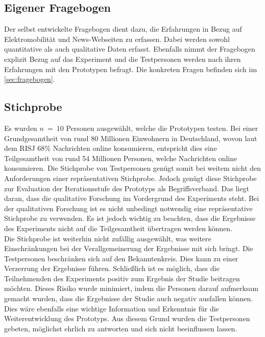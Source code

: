 \subsection{Eigener Fragebogen}
Der selbst entwickelte Fragebogen dient dazu, die Erfahrungen in Bezug auf Elektromobilität und News-Webseiten zu erfassen.
Dabei werden sowohl quantitative als auch qualitative Daten erfasst.
Ebenfalls nimmt der Fragebogen explizit Bezug auf das Experiment und die Testpersonen werden nach ihren Erfahrungen mit den Prototypen befragt.
Die konkreten Fragen befinden sich im \autoref{sec:fragebogen}.

\subsection{Stichprobe}
Es wurden $n\ =\ 10$ Personen ausgewählt, welche die Prototypen testen.
Bei einer Grundgesamtheit von rund 80 Millionen Einwohnern in Deutschland, wovon laut dem \ac{RISJ} $68\%$ Nachrichten online konsumieren, entspricht dies eine Teilgesamtheit von rund 54 Millionen Personen, welche Nachrichten online konsumieren.
Die Stichprobe von Testpersonen genügt somit bei weitem nicht den Anforderungen einer repräsentativen Stichprobe.
Jedoch genügt diese Stichprobe zur Evaluation der Iterationsstufe des Prototyps als Begriffsverband.
Das liegt daran, dass die qualitative Forschung im Vordergrund des Experiments steht.
Bei der qualitativen Forschung ist es nicht unbedingt notwendig eine repräsentative Stichprobe zu verwenden.
Es ist jedoch wichtig zu beachten, dass die Ergebnisse des Experiments nicht auf die Teilgesamtheit übertragen werden können.\\

Die Stichprobe ist weiterhin nicht zufällig ausgewählt, was weitere Einschränkungen bei der Verallgemeinerung der Ergebnisse mit sich bringt.
Die Testpersonen beschränken sich auf den Bekanntenkreis.
Dies kann zu einer Verzerrung der Ergebnisse führen.
Schließlich ist es möglich, dass die Teilnehmenden des Experiments positiv zum Ergebnis der Studie beitragen möchten.
Dieses Risiko wurde minimiert, indem die Personen darauf aufmerksam gemacht wurden, dass die Ergebnisse der Studie auch negativ ausfallen können.
Dies wäre ebenfalls eine wichtige Information und Erkenntnis für die Weiterentwicklung des Prototyps.
Aus diesem Grund wurden die Testpersonen gebeten, möglichst ehrlich zu antworten und sich nicht beeinflussen lassen.\\

